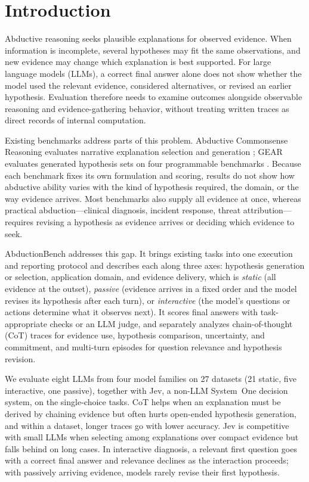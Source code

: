 \section{Introduction}
\label{sec:introduction}

Abductive reasoning seeks plausible explanations for observed evidence. When information is incomplete, several hypotheses may fit the same observations, and new evidence may change which explanation is best supported. For large language models (LLMs), a correct final answer alone does not show whether the model used the relevant evidence, considered alternatives, or revised an earlier hypothesis. Evaluation therefore needs to examine outcomes alongside observable reasoning and evidence-gathering behavior, without treating written traces as direct records of internal computation.

Existing benchmarks address parts of this problem. Abductive Commonsense Reasoning evaluates narrative explanation selection and generation \citep{Bhagavatula2020Abductive}; GEAR evaluates generated hypothesis sets on four programmable benchmarks \citep{impl_he2025gear}. Because each benchmark fixes its own formulation and scoring, results do not show how abductive ability varies with the kind of hypothesis required, the domain, or the way evidence arrives. Most benchmarks also supply all evidence at once, whereas practical abduction---clinical diagnosis, incident response, threat attribution---requires revising a hypothesis as evidence arrives or deciding which evidence to seek.

AbductionBench addresses this gap. It brings existing tasks into one execution and reporting protocol and describes each along three axes: hypothesis generation or selection, application domain, and evidence delivery, which is \emph{static} (all evidence at the outset), \emph{passive} (evidence arrives in a fixed order and the model revises its hypothesis after each turn), or \emph{interactive} (the model's questions or actions determine what it observes next). It scores final answers with task-appropriate checks or an LLM judge, and separately analyzes chain-of-thought (CoT) traces for evidence use, hypothesis comparison, uncertainty, and commitment, and multi-turn episodes for question relevance and hypothesis revision.

We evaluate eight LLMs from four model families on 27 datasets (21 static, five interactive, one passive), together with Jev, a non-LLM System~One decision system, on the single-choice tasks. CoT helps when an explanation must be derived by chaining evidence but often hurts open-ended hypothesis generation, and within a dataset, longer traces go with lower accuracy. Jev is competitive with small LLMs when selecting among explanations over compact evidence but falls behind on long cases. In interactive diagnosis, a relevant first question goes with a correct final answer and relevance declines as the interaction proceeds; with passively arriving evidence, models rarely revise their first hypothesis.

